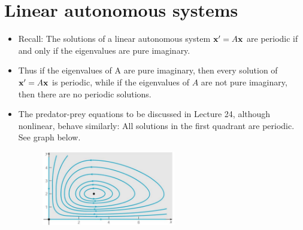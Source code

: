 \documentclass[11pt,a4paper]{article}
\begin{document}
	\section*{Linear autonomous systems}
	\begin{itemize}
		\item Recall: The solutions of a linear autonomous system $\vb{x}^\prime = A\vb{x}$ are periodic if and only if the eigenvalues are pure imaginary.
		\item Thus if the eigenvalues of A are pure imaginary, then every solution of $\vb{x}^\prime = A\vb{x}$ is periodic, while if the eigenvalues of $A$ are not pure  imaginary, then there are no periodic solutions.
		\item The predator-prey equations to be discussed in Lecture 24, although nonlinear, behave similarly: All solutions in the first quadrant are periodic. See graph below.
		\begin{figure}[H]
			\centering
			\includegraphics[width=0.55\textwidth]{figure/Lec19f1.PNG}
		\end{figure}
	\end{itemize}
\end{document}
